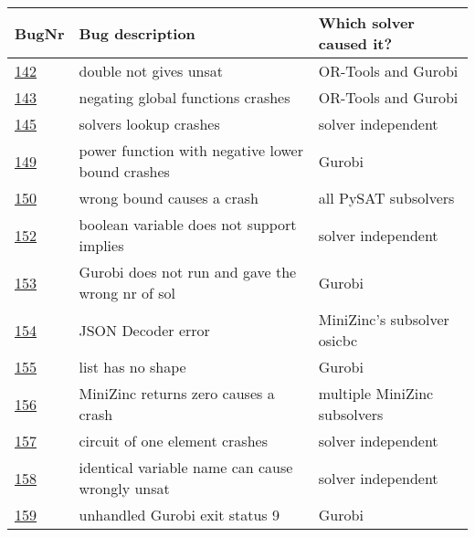 \begin{table}[]
	\centering
	\begin{tabular}{lll}
		BugNr & Bug description                                           & Which solver caused it?\\ \toprule
		\href{https://github.com/CPMpy/cpmpy/issues/142}{142} & double not gives unsat                            & OR-Tools and Gurobi          \\
		\href{https://github.com/CPMpy/cpmpy/issues/143}{143} & negating global functions crashes                 & OR-Tools and Gurobi          \\
		\href{https://github.com/CPMpy/cpmpy/issues/145}{145} & solvers lookup crashes                            & solver independent           \\
		\href{https://github.com/CPMpy/cpmpy/issues/149}{149} & power function with negative lower bound crashes  & Gurobi                       \\
		\href{https://github.com/CPMpy/cpmpy/issues/150}{150} & wrong bound causes a crash                  & all PySAT subsolvers         \\
		\href{https://github.com/CPMpy/cpmpy/issues/152}{152} & boolean variable does not support implies         & solver independent           \\
		\href{https://github.com/CPMpy/cpmpy/issues/153}{153} & Gurobi does not run and gave the wrong nr of sol  & Gurobi                       \\
		\href{https://github.com/CPMpy/cpmpy/issues/154}{154} & JSON Decoder error                                & MiniZinc's subsolver osicbc  \\
		\href{https://github.com/CPMpy/cpmpy/issues/155}{155} & list has no shape                                 & Gurobi                       \\
		\href{https://github.com/CPMpy/cpmpy/issues/156}{156} & MiniZinc returns zero causes a crash              & multiple MiniZinc subsolvers \\
		\href{https://github.com/CPMpy/cpmpy/issues/157}{157} & circuit of one element crashes                    & solver independent           \\
		\href{https://github.com/CPMpy/cpmpy/issues/158}{158} & identical variable name can cause wrongly unsat   & solver independent           \\
		\href{https://github.com/CPMpy/cpmpy/issues/159}{159} & unhandled Gurobi exit status 9                    & Gurobi                       \\

\end{tabular}
\end{table}
